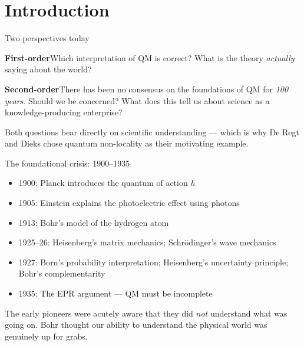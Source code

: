 \documentclass[fleql]{beamer}
\begin{document}
\section{Introduction}

\begin{frame}{Two perspectives today}

  \textbf{First-order}\enspace Which interpretation of QM is
  correct? What is the theory \emph{actually} saying about
  the world?

  \bigskip

  \textbf{Second-order}\enspace There has been no consensus on
  the foundations of QM for \emph{100 years}. Should we be
  concerned? What does this tell us about science as a
  knowledge-producing enterprise?

  \bigskip

  Both questions bear directly on scientific understanding ---
  which is why De Regt and Dieks chose quantum non-locality as
  their motivating example.

\end{frame}

\begin{frame}{The foundational crisis: 1900--1935}

  \begin{itemize}\small
  \item 1900: Planck introduces the quantum of action $h$
  \item 1905: Einstein explains the photoelectric effect using photons
  \item 1913: Bohr's model of the hydrogen atom
  \item 1925--26: Heisenberg's matrix mechanics; Schr\"{o}dinger's
    wave mechanics
  \item 1927: Born's probability interpretation; Heisenberg's
    uncertainty principle; Bohr's complementarity
  \item 1935: The EPR argument --- QM must be incomplete
  \end{itemize}

  \vspace{0.4em}
  \small The early pioneers were acutely aware that they did
  \emph{not} understand what was going on. Bohr thought our
  ability to understand the physical world was genuinely up
  for grabs.

\end{frame}
\end{document}
